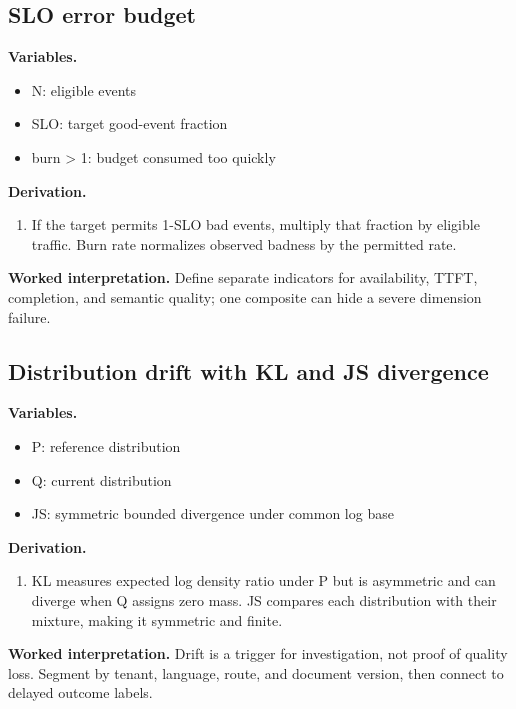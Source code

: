 \subsection{SLO error budget}
\textbf{Variables.}\begin{itemize}
\item N: eligible events
\item SLO: target good-event fraction
\item burn > 1: budget consumed too quickly
\end{itemize}
\textbf{Derivation.}\begin{derivation}\begin{enumerate}
\item If the target permits 1-SLO bad events, multiply that fraction by eligible traffic. Burn rate normalizes observed badness by the permitted rate.
\end{enumerate}\end{derivation}
\textbf{Worked interpretation.} Define separate indicators for availability, TTFT, completion, and semantic quality; one composite can hide a severe dimension failure.
\subsection{Distribution drift with KL and JS divergence}
\textbf{Variables.}\begin{itemize}
\item P: reference distribution
\item Q: current distribution
\item JS: symmetric bounded divergence under common log base
\end{itemize}
\textbf{Derivation.}\begin{derivation}\begin{enumerate}
\item KL measures expected log density ratio under P but is asymmetric and can diverge when Q assigns zero mass. JS compares each distribution with their mixture, making it symmetric and finite.
\end{enumerate}\end{derivation}
\textbf{Worked interpretation.} Drift is a trigger for investigation, not proof of quality loss. Segment by tenant, language, route, and document version, then connect to delayed outcome labels.
